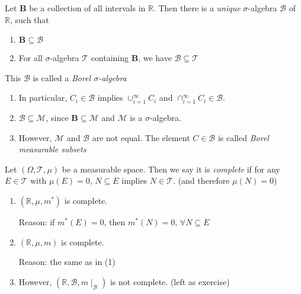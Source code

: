 \begin{definition}
Let $\bm{B}$ be a collection of all intervals in $\mathbb{R}$.
Then there is a \emph{unique} $\sigma$-algebra $\mathcal{B}$ of $\mathbb{R}$, such that
\begin{enumerate}
\item
$\bm B\subseteq\mathcal{B}$
\item
For all $\sigma$-algebra $\mathcal{T}$ containing $\bm B$, we have $\mathcal{B}\subseteq\mathcal{T}$
\end{enumerate}
This $\mathcal{B}$ is called a \emph{Borel $\sigma$-algebra}
\end{definition}
\begin{remark}
\begin{enumerate}
\item
In particular, $C_i\in\mathcal{B}$ implies $\cup_{i=1}^\infty C_i$ and $\cap_{i=1}^\infty C_i\in\mathcal{B}$.
\item
$\mathcal{B}\subseteq\mathcal{M}$, since $\bm B\subseteq\mathcal{M}$ and $\mathcal{M}$ is a $\sigma$-algebra.
\item
However, $\mathcal{M}$ and $\mathcal{B}$ are not equal.
The element $C\in\mathcal{B}$ is called \emph{Borel measurable subsets}
\end{enumerate}
\end{remark}
%
%

\begin{definition}[complete]
Let $(\Omega, \mathcal{T},\mu)$ be a measurable space.
Then we say it is \emph{complete} if for any $E\in\mathcal{T}$ with $\mu(E)=0$,
$N\subseteq E$ implies $N\in\mathcal{T}$. (and therefore $\mu(N)=0$)
\end{definition}

\begin{example}
\begin{enumerate}
\item
$(\mathbb{R},\mu,m^*)$ is complete.

Reason: if $m^*(E)=0$, then $m^*(N)=0$, $\forall N\subseteq E$
\item
$(\mathbb{R},\mu,m)$ is complete.

Reason: the same as in (1)
\item
However, $(\mathbb{R},\mathcal{B},m\mid_{\mathcal{B}})$ is not complete. (left as exercise)
\end{enumerate}
\end{example}

